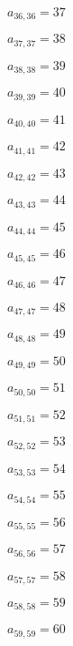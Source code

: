 \documentclass[a4paper,12pt]{article}
\begin{document}
$a _{ 36, 36 } = 37$

$a _{ 37, 37 } = 38$

$a _{ 38, 38 } = 39$

$a _{ 39, 39 } = 40$

$a _{ 40, 40 } = 41$

$a _{ 41, 41 } = 42$

$a _{ 42, 42 } = 43$

$a _{ 43, 43 } = 44$

$a _{ 44, 44 } = 45$

$a _{ 45, 45 } = 46$

$a _{ 46, 46 } = 47$

$a _{ 47, 47 } = 48$

$a _{ 48, 48 } = 49$

$a _{ 49, 49 } = 50$

$a _{ 50, 50 } = 51$

$a _{ 51, 51 } = 52$

$a _{ 52, 52 } = 53$

$a _{ 53, 53 } = 54$

$a _{ 54, 54 } = 55$

$a _{ 55, 55 } = 56$

$a _{ 56, 56 } = 57$

$a _{ 57, 57 } = 58$

$a _{ 58, 58 } = 59$

$a _{ 59, 59 } = 60$
\end{document}
